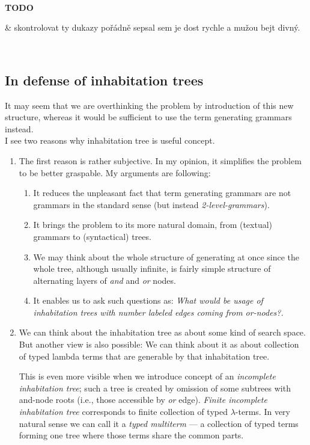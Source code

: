 \documentclass[12pt,a4paper]{report}
\newcommand{\lterms}{$\lambda$-terms\xspace}
\newenvironment{todo}
{ ~\\[0.5em]
  {\color{red}\textbf{TODO}}
  \begin{easylist}[itemize]}
{ \end{easylist}
  ~}
\begin{document}
\begin{todo}
& skontrolovat ty dukazy pořádně sepsal sem 
  je dost rychle a mužou bejt divný. 
\end{todo}


\newpage
\subsection{In defense of inhabitation trees}

It may seem that we are overthinking the problem by introduction
of this new structure, whereas it would be sufficient to
use the term generating grammars instead.\\

I see two reasons why inhabitation tree is useful concept.

\begin{enumerate}
\item The first reason is rather subjective.
      In my opinion, it simplifies the problem to be
      better graspable. My arguments are following: 
      \begin{enumerate}
      \item
      It reduces the unpleasant fact
      that term generating grammars are not grammars in
      the standard sense (but instead \textit{2-level-grammars}). 
      \item
      It brings the problem to 
      its more natural domain, 
      from (textual) grammars 
      to (syntactical) trees.
      \item
      We may think about the whole structure of generating 
      at once since the whole tree, although usually infinite, is
      fairly simple structure of alternating layers of \textit{and} 
      and \textit{or} nodes. 
      \item
      It enables us to ask such questions
      as: \textit{What would be usage of inhabitation trees with 
      number labeled edges coming from \textit{or}-nodes?.}
      \end{enumerate}   
\item We can think about the inhabitation tree as about 
      some kind of search space. But another view is also 
      possible: We can think about it as about collection
      of typed lambda terms that are generable by that inhabitation
      tree. 
      
      This is even more visible when we introduce
      concept of an \textit{incomplete inhabitation tree};
      such a tree is created by omission of some subtrees
      with and-node roots (i.e., those accessible by \textit{or} edge).
      \textit{Finite incomplete inhabitation tree} corresponds
      to finite collection of typed \lterms. In very natural 
      sense we can call it a \textit{typed multiterm} --- a collection
      of typed terms forming one tree where those terms share
      the common parts.
      

\end{enumerate}
\end{document}
